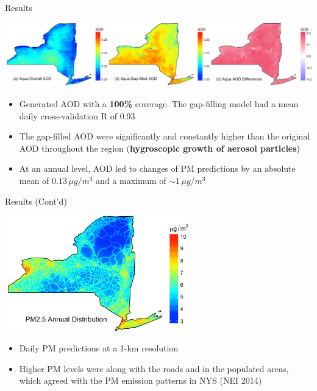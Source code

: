 \begin{frame}{Results}
    \begin{center}
        \includegraphics[width=\textwidth]{img/aod.jpg}
    \end{center}
    \begin{itemize}
        \item Generated AOD with a \textbf{100\%} coverage. The gap-filling model had a mean daily cross-validation R of 0.93
        \item The gap-filled AOD were significantly and constantly higher than the original AOD throughout the region (\textbf{hygroscopic growth of aerosol particles})
        \item At an annual level, AOD led to changes of PM predictions by an absolute mean of $0.13\, \mu g/m^3$ and a maximum of $\sim 1\, \mu g/m^3$
    \end{itemize}
\end{frame}

\begin{frame}{Results (Cont'd)}
    \begin{center}
        \includegraphics[width=0.6\textwidth]{img/pm25_nys.jpg}
    \end{center}
    \begin{itemize}
        \item Daily PM predictions at a 1-km resolution
        \item Higher PM levels were along with the roads and in the populated areas, which agreed with the PM emission patterns in NYS (NEI 2014)
    \end{itemize}
\end{frame}

